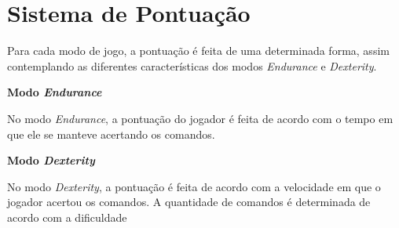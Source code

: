 \section{Sistema de Pontuação}

Para cada modo de jogo, a pontuação é feita de uma determinada forma, assim contemplando as diferentes características dos modos \textit{Endurance} e \textit{Dexterity}.

\textbf{Modo \textit{Endurance}}

No modo \textit{Endurance}, a pontuação do jogador é feita de acordo com o tempo em que ele se manteve acertando os comandos.

\textbf{Modo \textit{Dexterity}}

No modo \textit{Dexterity}, a pontuação é feita de acordo com a velocidade em que o jogador acertou os comandos. A quantidade de comandos é determinada de acordo com a dificuldade